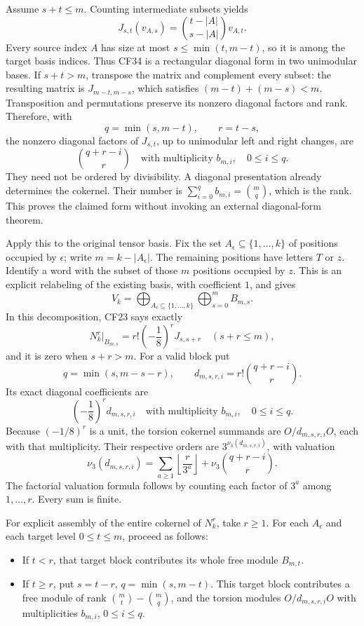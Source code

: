 \documentclass[
  10pt,
]{article}
\providecommand{\tightlist}{%
  \setlength{\itemsep}{0pt}\setlength{\parskip}{0pt}}
\begin{document}
Assume \(s+t\leq m\). Counting intermediate subsets yields \[
 J_{s,t}(v_{A,s})
 =\binom{t-|A|}{s-|A|}v_{A,t}.
 \tag{CF34}
\] Every source index \(A\) has size at most \(s\leq\min(t,m-t)\), so it
is among the target basis indices. Thus CF34 is a rectangular diagonal
form in two unimodular bases. If \(s+t>m\), transpose the matrix and
complement every subset: the resulting matrix is \(J_{m-t,m-s}\), which
satisfies \((m-t)+(m-s)<m\). Transposition and permutations preserve its
nonzero diagonal factors and rank. Therefore, with \[
 q=\min(s,m-t),\qquad r=t-s,
\] the nonzero diagonal factors of \(J_{s,t}\), up to unimodular left
and right changes, are \[
 \binom{q+r-i}{r}
 \quad\text{with multiplicity }b_{m,i},\quad0\leq i\leq q.
 \tag{CF35}
\] They need not be ordered by divisibility. A diagonal presentation
already determines the cokernel. Their number is
\(\sum_{i=0}^q b_{m,i}=\binom mq\), which is the rank. This proves the
claimed form without invoking an external diagonal-form theorem.

Apply this to the original tensor basis. Fix the set
\(A_\epsilon\subseteq\{1,\ldots,k\}\) of positions occupied by
\(\epsilon\); write \(m=k-|A_\epsilon|\). The remaining positions have
letters \(T\) or \(z\). Identify a word with the subset of those \(m\)
positions occupied by \(z\). This is an explicit relabeling of the
existing basis, with coefficient \(1\), and gives \[
 V_k=\bigoplus_{A_\epsilon\subseteq\{1,\ldots,k\}}
       \bigoplus_{s=0}^{m}B_{m,s}.
 \tag{CF36}
\] In this decomposition, CF23 says exactly \[
 N_k^r|_{B_{m,s}}=r!\left(-\frac18\right)^r J_{s,s+r}
 \quad(s+r\leq m),
 \tag{CF37}
\] and it is zero when \(s+r>m\). For a valid block put \[
 q=\min(s,m-s-r),\qquad
 d_{m,s,r,i}=r!\binom{q+r-i}{r}.
 \tag{CF38}
\] Its exact diagonal coefficients are \[
 \left(-\frac18\right)^r d_{m,s,r,i}
 \quad\text{with multiplicity }b_{m,i},\quad0\leq i\leq q.
 \tag{CF39}
\] Because \((-1/8)^r\) is a unit, the torsion cokernel summands are
\(O/d_{m,s,r,i}O\), each with that multiplicity. Their respective orders
are \(3^{\nu_3(d_{m,s,r,i})}\), with valuation \[
 \nu_3(d_{m,s,r,i})
 =\sum_{a\geq1}\left\lfloor\frac r{3^a}\right\rfloor
  +\nu_3\!\binom{q+r-i}{r}.
 \tag{CF40}
\] The factorial valuation formula follows by counting each factor of
\(3^a\) among \(1,\ldots,r\). Every sum is finite.

For explicit assembly of the entire cokernel of \(N_k^r\), take
\(r\geq1\). For each \(A_\epsilon\) and each target level
\(0\leq t\leq m\), proceed as follows:

\begin{itemize}
\tightlist
\item
  If \(t<r\), that target block contributes its whole free module
  \(B_{m,t}\).
\item
  If \(t\geq r\), put \(s=t-r\), \(q=\min(s,m-t)\). This target block
  contributes a free module of rank \(\binom mt-\binom mq\), and the
  torsion modules \(O/d_{m,s,r,i}O\) with multiplicities \(b_{m,i}\),
  \(0\leq i\leq q\).
\end{itemize}
\end{document}
